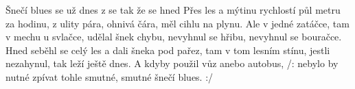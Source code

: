 \begin{TEXT}{Šnečí blues}
\SLOKA {}     se   \NL
{} už dnes  z  se tak  \NL
že se  hned     
\SLOKA Přes les a mýtinu rychlostí půl metru za hodinu, \NL
z ulity pára, ohnivá čára, \NL
měl cihlu na plynu. 
\SLOKA Ale v jedné zatáčce, tam v mechu u svlačce, \NL
udělal šnek chybu, nevyhnul se hřibu, \NL
nevyhnul se bouračce.
\SLOKA Hned seběhl se celý les a dali šneka pod pařez, \NL
tam v tom lesním stínu, jestli nezahynul, \NL
tak leží ještě dnes.
\SLOKA A kdyby použil vůz anebo autobus, \NL
/: nebylo by nutné zpívat tohle smutné, \NL
smutné šnečí blues. :/ 
\end{TEXT}
